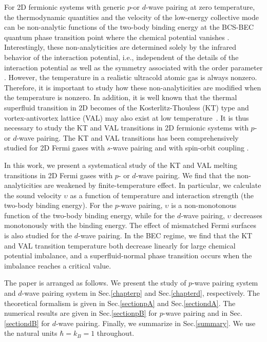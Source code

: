 \documentclass[aps,prd,amsmath,two column,nofootinbib,amssymb,referee]{revtex4}
\begin{document}
For 2D fermionic systems with generic $p$-or $d$-wave pairing at zero temperature, the thermodynamic quantities and the velocity of the low-energy collective mode can be non-analytic functions of the two-body binding energy at the BCS-BEC quantum phase transition point where the chemical potential vanishes \cite{Botelho2005a,Botelho2005b,Cao2013}. Interestingly, these non-analyticities are determined solely by the infrared behavior of the interaction potential, i.e., independent of the details of the interaction potential as well as the symmetry associated with the order parameter \cite{Cao2013}. However, the temperature in a realistic ultracold atomic gas is always nonzero. Therefore, it is important to study how these non-analyticities are modified when the temperature is nonzero. In addition, it is well known that the thermal superfluid transition in 2D becomes of the Kosterlitz-Thouless (KT) type and vortex-antivortex lattice (VAL) may also exist at low temperature~\cite{BKT,Nelson1979,Young}. It is thus necessary to study the KT and VAL transitions in 2D fermionic systems with $p$-or $d$-wave pairing. The KT and VAL transitions has been comprehensively studied for 2D Fermi gases with $s$-wave pairing \cite{Loktev2001,BKT-S02,BKT-S03,BKT-S04,BKT-S05,BKT-S06,BKT-S07,BKT-S08} and with spin-orbit coupling \cite{BKT-SOC01,BKT-SOC02,BKT-SOC03,BKT-SOC04,BKT-SOC05}. 

In this work, we present a systematical study of the KT and VAL melting transitions in 2D Fermi gases with $p$- or $d$-wave pairing. We find that the non-analyticities are weakened by finite-temperature effect. In particular, we calculate the sound velocity $\upsilon$ as a function of  temperature and interaction strength (the two-body binding energy). For the $p$-wave pairing, $\upsilon$ is a non-monotonous function of the two-body binding energy, while for the $d$-wave pairing, $\upsilon$ decreases monotonously with the binding energy. The effect of mismatched Fermi surfaces is also studied for the $d$-wave pairing. In the BEC regime, we find that the KT and VAL transition temperature both decrease linearly for large chemical potential imbalance, and a superfluid-normal phase transition occurs when the imbalance reaches a critical value.

The paper is arranged as follows. We present the study of $p$-wave pairing system and $d$-wave pairing system in Sec.\ref{chapterp} and Sec.\ref{chapterd}, respectively. The theoretical formalism is given in Sec.\ref{sectionpA} and Sec.\ref{sectiondA}. The numerical results are given in Sec.\ref{sectionpB} for $p$-wave pairing and in Sec.\ref{sectiondB} for $d$-wave pairing. Finally, we summarize in Sec.\ref{summary}. We use the natural units $\hbar=k_B=1$ throughout.
\end{document}
